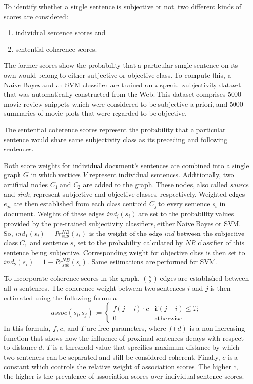 \documentclass[a4paper,11pt]{article}
\begin{document}
To identify whether a single sentence is subjective or not, two
different kinds of scores are considered:
\begin{enumerate}
  \item individual sentence scores and
  \item sentential coherence scores.
\end{enumerate}
The former scores show the probability that a particular single
sentence on its own would belong to either subjective or objective
class.  To compute this, a Naive Bayes and an SVM classifier are
trained on a special subjectivity dataset that was automatically
constructed from the Web.  This dataset comprises 5000 movie review
snippets which were considered to be subjective a priori, and 5000
summaries of movie plots that were regarded to be objective.

The sentential coherence scores represent the probability that a
particular sentence would share same subjectivity class as its
preceding and following sentences.

Both score weights for individual document's sentences are combined
into a single graph $G$ in which vertices $V$ represent individual
sentences.  Additionally, two artificial nodes $C_1$ and $C_2$ are
added to the graph.  These nodes, also called \textit{source} and
\textit{sink}, represent subjective and objective classes,
respectively.  Weighted edges \textit{$e_{ji}$} are then established
from each class centroid $C_j$ to every sentence $s_i$ in document.
Weights of these edges $ind_j(s_i)$ are set to the probability values
provided by the pre-trained subjectivity classifiers, either Naive
Bayes or SVM.  So, $ind_1(s_i) = Pr^{NB}_{sub}(s_i)$ is the weight of
the edge $ind$ between the subjective class $C_1$ and sentence $s_i$
set to the probability calculated by $NB$ classifier of this sentence
being subjective.  Corresponding weight for objective class is then
set to $ind_2(s_i) = 1 - Pr^{NB}_{sub}(s_i)$.  Same estimations are
performed for SVM.

To incorporate coherence scores in the graph, $\binom{n}{2}$ edges are
established between all $n$ sentences.  The coherence weight between
two sentences $i$ and $j$ is then estimated using the following formula:
\begin{displaymath}
  assoc(s_i, s_j) := \begin{cases}
    f(j -i) \cdot c & \text{if} (j - i) \leq T;\\
   0 & \text{otherwise}
  \end{cases}
\end{displaymath}
In this formula, $f$, $c$, and $T$ are free parameters, where $f(d)$
is a non-increasing function that shows how the influence of proximal
sentences decays with respect to distance $d$.  $T$ is a threshold
value that specifies maximum distance by which two sentences can be
separated and still be considered coherent.  Finally, $c$ is a
constant which controls the relative weight of association scores.
The higher $c$, the higher is the prevalence of association scores
over individual sentence scores.
\end{document}
